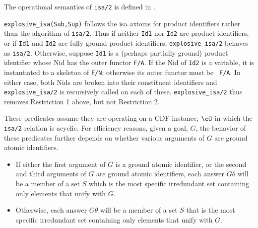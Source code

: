\begin{description}
 The operational semantics of
{\tt isa/2} is defined in .


{\tt explosive\_isa(Sub,Sup)} follows the isa axioms for product
identifiers rather than the algorithm of {\tt isa/2}. Thus if neither
{\tt Id1} nor {\tt Id2} are product identifiers, or if {\tt Id1} and
{\tt Id2} are fully ground product identifiers, {\tt explosive\_isa/2}
behaves as {\tt isa/2}.  Otherwise, suppose {\tt Id1} is a (perhaps
partially ground) product identifier whose Nid has the outer functor
{\tt F/A}.  If the Nid of {\tt Id2} is a variable, it is instantiated
to a skeleton of {\tt F/N}; otherwise its outer functor must be {\tt
F/A}.  In either case, both Nids are broken into their constituent
identifiers and {\tt explosive\_isa/2} is recursively called on each
of these.  {\tt explosive\_isa/2} thus removes Restriction 1 above,
but not Restriction 2.





%
These predicates assume they are operating on a CDF instance, $\cO$ in
which the {\tt isa/2} relation is acyclic.  For efficiency reasons,
given a goal, $G$, the behavior of these predicates further depends on
whether various arguments of $G$ are ground atomic identifiers. 
\begin{itemize}
\item  If either the first argument of $G$ is a ground atomic
identifier, or the second and third arguments of $G$ are ground atomic
identifiers, each answer $G\theta$ will be a member of a set $S$ which
is the most specific irredundant set containing only elements that
unify with $G$.
%
\item Otherwise, each answer $G\theta$ will be a member of a set $S$ that 
is the most specific irredundant set containing only elements that
unify with $G$.
\end{itemize}



\end{description}
